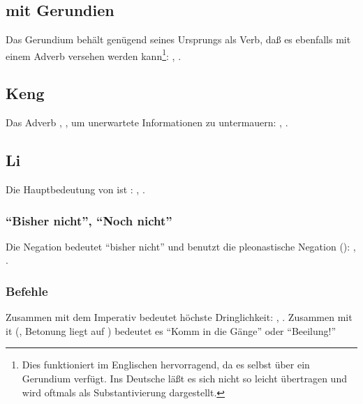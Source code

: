 \subsection{mit Gerundien} Das Gerundium beh\"alt gen\"ugend seines Ursprungs als
Verb, da\ss{} es ebenfalls mit einem Adverb versehen werden kann\footnote{Dies funktioniert
im Englischen hervorragend, da es selbst \"uber ein Gerundium verf\"ugt. Ins Deutsche l\"a\ss{}t
es sich nicht so leicht \"ubertragen und wird oftmals als Substantivierung dargestellt.}:
, .
\label{syn:adverbs:gerund}

\subsection{Keng} Das Adverb , , um unerwartete Informationen
zu untermauern: , .

\subsection{Li} Die Hauptbedeutung von  ist :
, .

\subsubsection{"`Bisher nicht"', "`Noch nicht"'} Die Negation  bedeutet "`bisher
nicht"' und benutzt die pleonastische Negation (): , .



\subsubsection{Befehle} Zusammen mit dem Imperativ bedeutet  h\"ochste Dringlichkeit:
, .
Zusammen mit it  (, Betonung liegt auf ) bedeutet
es "`Komm in die G\"ange"' oder "`Beeilung!"'


